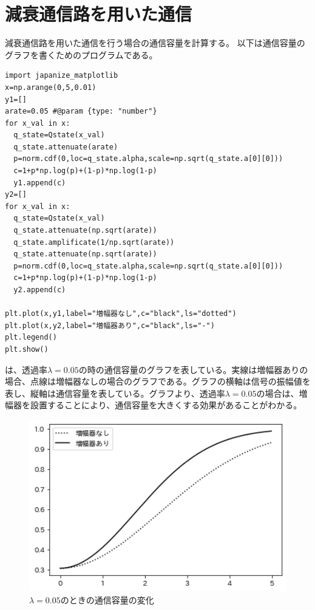 \chapter{減衰通信路を用いた通信}
減衰通信路を用いた通信を行う場合の通信容量を計算する。
以下は通信容量のグラフを書くためのプログラムである。

\begin{lstlisting}[caption=減衰通信路の通信容量,label=program5_1]
import japanize_matplotlib
x=np.arange(0,5,0.01)
y1=[]
arate=0.05 #@param {type: "number"}
for x_val in x:
  q_state=Qstate(x_val)
  q_state.attenuate(arate)
  p=norm.cdf(0,loc=q_state.alpha,scale=np.sqrt(q_state.a[0][0]))
  c=1+p*np.log(p)+(1-p)*np.log(1-p)
  y1.append(c)
y2=[]
for x_val in x:
  q_state=Qstate(x_val)
  q_state.attenuate(np.sqrt(arate))
  q_state.amplificate(1/np.sqrt(arate))
  q_state.attenuate(np.sqrt(arate))
  p=norm.cdf(0,loc=q_state.alpha,scale=np.sqrt(q_state.a[0][0]))
  c=1+p*np.log(p)+(1-p)*np.log(1-p)
  y2.append(c)

plt.plot(x,y1,label="増幅器なし",c="black",ls="dotted")
plt.plot(x,y2,label="増幅器あり",c="black",ls="-")
plt.legend()
plt.show()
\end{lstlisting}

は、透過率$\lambda=0.05$の時の通信容量のグラフを表している。実線は増幅器ありの場合、点線は増幅器なしの場合のグラフである。グラフの横軸は信号の振幅値を表し、縦軸は通信容量を表している。グラフより、透過率$\lambda=0.05$の場合は、増幅器を設置することにより、通信容量を大きくする効果があることがわかる。

    \begin{figure}[H]
        \centering   
        \includegraphics[width=1\textwidth]{img/Fig5_1.png}
        \caption[sample image (png)]{$\lambda=0.05$のときの通信容量の変化}
        \label{Fig5_1}
    \end{figure}

